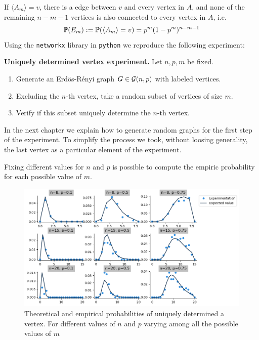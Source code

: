 If $\langle A_{m} \rangle = v$, there is a edge between $v$ and every vertex in $A$, and none of the remaining $n-m-1$ vertices is also connected to every vertex in $A$, i.e.
$$\P (E_m) := \P(\langle A_{m}\rangle = v) = p^{m}(1-p^{m})^{n-m-1}$$
Using the \texttt{networkx} library in \texttt{python} we reproduce the following experiment:

\begin{cajita}
\textbf{Uniquely determined vertex experiment.} Let $n,p,m$ be fixed.
\begin{enumerate}
\item Generate an Erdös-Rényi graph $G\in \G(n,p)$ with labeled vertices.
\item Excluding the $n$-th vertex, take a random subset of vertices of size $m$.
\item Verify if this subset uniquely determine the $n$-th vertex.
\end{enumerate}
\end{cajita}

In the next chapter we explain how to generate random graphs for the first step of the experiment. To simplify the process we took, without loosing generality, the last vertex as a particular element of the experiment.

Fixing different values for $n$ and $p$ is possible to compute the empiric probability for each possible value of $m$.

\begin{figure}[h!]\label{figureExp1}
	\centering
	\includegraphics[scale=0.55]{Python/Figures/Uniquely-determinated-fixed-vertex.png}
	\caption{Theoretical and empirical probabilities of uniquely determined a vertex. For different values of $n$ and $p$ varying among all the possible values of $m$}
\end{figure}

